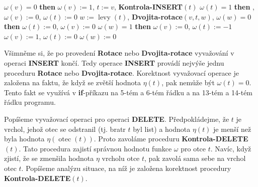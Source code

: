 \documentclass[a4paper,12pt]{article}
\DeclareMathOperator*{\otec}{otec}
\DeclareMathOperator*{\levy}{levy}
\begin{document}
\phantom{---}{\bf else}\newline 
\phantom{------}{\bf if} $\omega (v)=0$ {\bf then}\newline 
\phantom{---------}$\omega (v):=1$, $t:=v$, {\bf Kontrola-INSERT}$(t)$\newline 
\phantom{------}{\bf else}\newline 
\phantom{---------}{\bf if} $\omega (t)=1$ {\bf then}\newline 
\phantom{------------}{\bf Rotace$(v,t)$}, $\omega (v):=0$, $\omega (t):=0$\newline 
\phantom{---------}{\bf else}\newline 
\phantom{------------}$w:=\levy(t)$, {\bf Dvojita-rotace$(v,t,w)$},\newline 
\phantom{------------}{\bf if} $\omega (w)=0$ {\bf then}\newline 
\phantom{---------------}$\omega (t):=0$, $\omega (v):=0$\newline 
\phantom{------------}{\bf else}\newline 
\phantom{---------------}{\bf if} $\omega (w)=1$ {\bf then}\newline 
\phantom{------------------}$\omega (v):=0$, $\omega(t):=-1$\newline 
\phantom{---------------}{\bf else}\newline 
\phantom{------------------}$\omega (v):=1$, $\omega (t):=0$\newline 
\phantom{---------------}{\bf endif}\newline 
\phantom{------------}{\bf endif}\newline 
\phantom{------------}$\omega (w):=0$\newline 
\phantom{---------}{\bf endif}\newline 
\phantom{------}{\bf endif}\newline 
\phantom{---}{\bf endif\newline 
endif}

Všimněme si, že po provedení {\bf Rotace} nebo
{\bf Dvojita-rotace} vyvažování v operaci {\bf INSERT} končí. Tedy 
operace {\bf INSERT} provádí nejvýše jednu proceduru {\bf Rotace }
nebo {\bf Dvojita-rota\-ce}. Korektnost vyvažovací operace je 
založena na faktu, že když se zvětší hodnota $
\eta (t)$, pak 
nemůže být $\omega (t)=0$. Tento fakt se využívá  v 
{\bf if}-příkazu na 5-tém a 6-tém řádku a na 13-tém a 14-tém  
řádku programu.

Popíšeme vyvažovací operaci pro operaci 
{\bf DELETE}.  Před\-po\-kládejme, že $t$ je vrchol, jehož otec se 
odstranil (tj.  bratr $t$ byl list) a hodnota $\eta (t)$ je menší 
než byla hodnota $\eta (\otec(t))$.  Proto zavoláme proceduru 
{\bf Kontrola-DELETE$(t)$}.  Tato procedura zajistí správnou 
hodnotu funkce $\omega$ pro otce $t$.  Navíc, když zjistí, že se 
zmenšila hodnota $\eta$ vrcholu otce $t$, pak zavolá sama sebe 
na vrchol otec $t$. Popíšeme analýzu situace, na níž je 
založena korektnost procedury {\bf Kontrola-DELETE$(t)$}.  
\end{document}
